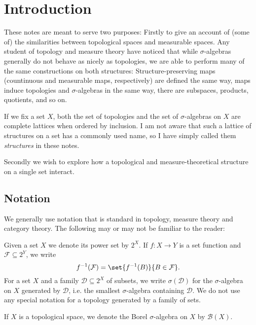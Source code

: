 \documentclass[article, a4paper, 11pt, oneside]{memoir}
\title{\doctitle}
\author{\docauthor}
\numberwithin{equation}{chapter}
\newcommand{\calD}{\mathcal{D}}
\newcommand{\calF}{\mathcal{F}}
\newcommand{\borel}{\mathcal{B}}
\newcommand{\powerset}[1]{2^{#1}}
\newcommand{\preim}{^{-1}}
\begin{document}
\maketitle

\chapter{Introduction}

These notes are meant to serve two purposes: Firstly to give an account of (some of) the similarities between topological spaces and measurable spaces. Any student of topology and measure theory have noticed that while $\sigma$-algebras generally do not behave as nicely as topologies, we are able to perform many of the same constructions on both structures: Structure-preserving maps (countinuous and measurable maps, respectively) are defined the same way, maps induce topologies and $\sigma$-algebras in the same way, there are subspaces, products, quotients, and so on.

If we fix a set $X$, both the set of topologies and the set of $\sigma$-algebras on $X$ are complete lattices when ordered by inclusion. I am not aware that such a lattice of structures on a set has a commonly used name, so I have simply called them \emph{structures} in these notes.

Secondly we wish to explore how a topological and measure-theoretical structure on a single set interact.


\section{Notation}

We generally use notation that is standard in topology, measure theory and category theory. The following may or may not be familiar to the reader:

Given a set $X$ we denote its power set by $\powerset{X}$. If $f \colon X \to Y$ is a set function and $\calF \subseteq \powerset{Y}$, we write
%
\begin{equation*}
    f\preim(\calF)
        = \set{f\preim(B)}{B \in \calF}.
\end{equation*}
%
For a set $X$ and a family $\calD \subseteq \powerset{X}$ of subsets, we write $\sigma(\calD)$ for the $\sigma$-algebra on $X$ generated by $\calD$, i.e. the smallest $\sigma$-algebra containing $\calD$. We do not use any special notation for a topology generated by a family of sets.

If $X$ is a topological space, we denote the Borel $\sigma$-algebra on $X$ by $\borel(X)$.
\end{document}

